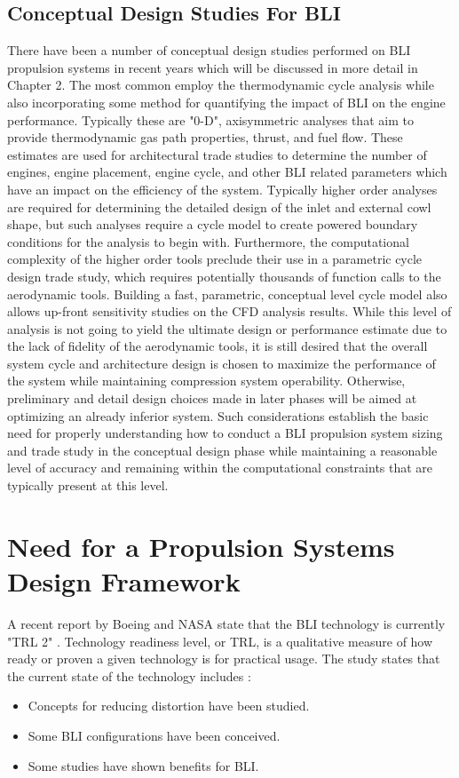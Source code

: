 \subsection{Conceptual Design Studies For BLI}
There have been a number of conceptual design studies performed on BLI propulsion systems in recent years which will be discussed in more detail in Chapter 2. The most common employ the thermodynamic cycle analysis while also incorporating some method for quantifying the impact of BLI on the engine performance. Typically these are "0-D", axisymmetric analyses that aim to provide thermodynamic gas path properties, thrust, and fuel flow.  These estimates are used for architectural trade studies to determine the number of engines, engine placement, engine cycle, and other BLI related parameters which have an impact on the efficiency of the system. Typically higher order analyses are required for determining the detailed design of the inlet and external cowl shape, but such analyses require a cycle model to create powered boundary conditions for the analysis to begin with.  Furthermore, the computational complexity of the higher order tools preclude their use in a parametric cycle design trade study, which requires potentially thousands of function calls to the aerodynamic tools.  Building a fast, parametric, conceptual level cycle model also allows up-front sensitivity studies on the CFD analysis results.  While this level of analysis is not going to yield the ultimate design or performance estimate due to the lack of fidelity of the aerodynamic tools, it is still desired that the overall system cycle and architecture design is chosen to maximize the performance of the system while maintaining compression system operability.  Otherwise, preliminary and detail design choices made in later phases will be aimed at optimizing an already inferior system.  Such considerations establish the basic need for properly understanding how to conduct a BLI propulsion system sizing and trade study in the conceptual design phase while maintaining a reasonable level of accuracy and remaining within the computational constraints that are typically present at this level.

\section{Need for a Propulsion Systems Design Framework}
\indent A recent report by Boeing and NASA state that the BLI technology is currently "TRL 2" \cite{Bradley2012}.  Technology readiness level, or TRL, is a qualitative measure of how ready or proven a given technology is for practical usage.  The study states that the current state of the technology includes \cite{Bradley2012}:
\begin{itemize}
\item{Concepts for reducing distortion have been studied.}
\item{Some BLI configurations have been conceived.}
\item{Some studies have shown benefits for BLI.}
\end{itemize}

